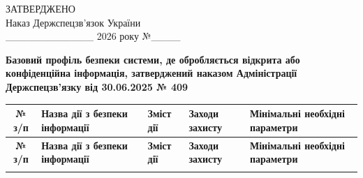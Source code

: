 \documentclass[10pt]{article}
\begin{document}
\begin{flushright}
ЗАТВЕРДЖЕНО\\
Наказ Держспецзв’язок України\\
\_\_\_\_\_\_\_\_\_\_\_\_ 2026 року №\_\_\_\_
\end{flushright}

\begin{center}
\textbf{\large Базовий профіль безпеки системи, де обробляється відкрита або конфіденційна інформація, затверджений наказом Адміністрації Держспецзв’язку від 30.06.2025 № 409}
\end{center}

\footnotesize
\begin{longtable}{|c|>{\raggedright\arraybackslash}p{4cm}|>{\raggedright\arraybackslash}p{6cm}|>{\raggedright\arraybackslash}p{1.5cm}|>{\raggedright\arraybackslash}p{3.5cm}|}
\hline
\textbf{№ з/п} & \textbf{Назва дії з безпеки інформації} & \textbf{Зміст дії} & \textbf{Заходи захисту} & \textbf{Мінімальні необхідні параметри}\\
\hline
\endfirsthead

\hline
\textbf{№ з/п} & \textbf{Назва дії з безпеки інформації} & \textbf{Зміст дії} & \textbf{Заходи захисту} & \textbf{Мінімальні необхідні параметри}\\
\hline
\endhead

\hline
\endfoot

\hline
\endlastfoot


\end{longtable}
\end{document}

